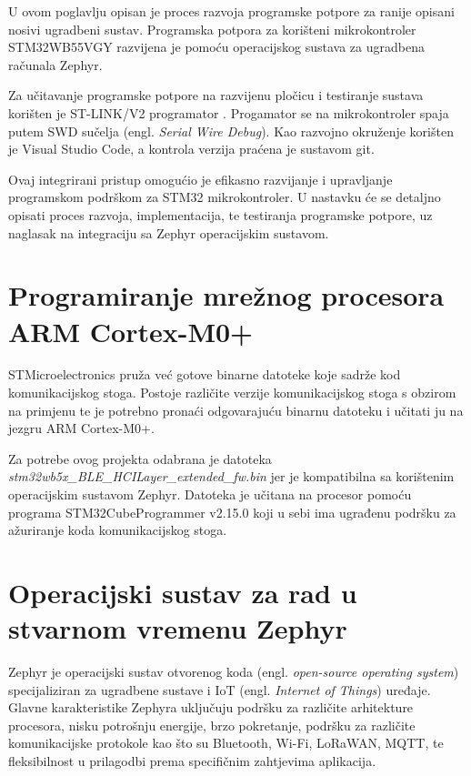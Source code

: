 \documentclass[../diplomski_rad.tex]{subfiles}
\begin{document}
\sloppy

\justifying

U ovom poglavlju opisan je proces razvoja programske potpore za ranije opisani nosivi ugradbeni sustav. 
Programska potpora za korišteni mikrokontroler STM32WB55VGY razvijena je pomoću operacijskog sustava 
za ugradbena računala Zephyr.

Za učitavanje programske potpore na razvijenu pločicu i testiranje sustava korišten je ST-LINK/V2 programator \cite{stm32programator}. 
Progamator se na mikrokontroler spaja putem SWD sučelja (engl. \textit{Serial Wire Debug}). 
Kao razvojno okruženje korišten je Visual Studio Code, a kontrola verzija praćena je sustavom git.

Ovaj integrirani pristup omogućio je efikasno razvijanje i upravljanje programskom podrškom za STM32 mikrokontroler. 
U nastavku će se detaljno opisati proces razvoja, implementacija, te testiranja programske potpore, 
uz naglasak na integraciju sa Zephyr operacijskim sustavom.

\section{Programiranje mrežnog procesora ARM Cortex-M0+}

STMicroelectronics pruža već gotove binarne datoteke \cite{kodovi_M0} koje sadrže kod komunikacijskog stoga. 
Postoje različite verzije komunikacijskog stoga s obzirom na primjenu te je potrebno pronaći odgovarajuću 
binarnu datoteku i učitati ju na jezgru ARM Cortex-M0+.

Za potrebe ovog projekta odabrana je datoteka \textit{stm32wb5x\_BLE\_HCILayer\_extended\_fw.bin} jer je kompatibilna sa 
korištenim operacijskim sustavom Zephyr. Datoteka je učitana na procesor pomoću programa STM32CubeProgrammer v2.15.0 
koji u sebi ima ugrađenu podršku za ažuriranje koda komunikacijskog stoga. 



\section{Operacijski sustav za rad u stvarnom vremenu Zephyr}

Zephyr je operacijski sustav otvorenog koda (engl. \textit{open-source operating system}) specijaliziran za ugradbene sustave 
i IoT (engl. \textit{Internet of Things}) uređaje.
Glavne karakteristike Zephyra uključuju podršku za različite arhitekture procesora, 
nisku potrošnju energije, brzo pokretanje, podršku za različite komunikacijske protokole kao što su 
Bluetooth, Wi-Fi, LoRaWAN, MQTT, te fleksibilnost u prilagodbi prema specifičnim zahtjevima aplikacija.
\end{document}
